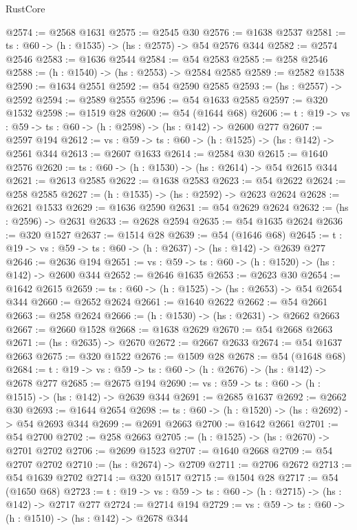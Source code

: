 \begin{lexlean}{RustCore}
\begin{coremodule}
@2574 := @2568 @1631
@2575 := @2545 @30
@2576 := @1638 @2537
@2581 := {ts : @60} -> (h : @1535) -> (hs : @2575) -> @54 @2576 @344
@2582 := @2574 @2546
@2583 := @1636 @2544
@2584 := @54 @2583
@2585 := @258 @2546
@2588 := (h : @1540) -> (hs : @2553) -> @2584 @2585
@2589 := @2582 @1538
@2590 := @1634 @2551
@2592 := @54 @2590 @2585
@2593 := (hs : @2557) -> @2592
@2594 := @2589 @2555
@2596 := @54 @1633 @2585
@2597 := @320 @1532
@2598 := @1519 @28
@2600 := @54 (@1644 @68)
@2606 := {t : @19} -> {vs : @59} -> {ts : @60} -> (h : @2598) -> (hs : @142) -> @2600 @277
@2607 := @2597 @194
@2612 := {vs : @59} -> {ts : @60} -> (h : @1525) -> (hs : @142) -> @2561 @344
@2613 := @2607 @1633
@2614 := @2584 @30
@2615 := @1640 @2576
@2620 := {ts : @60} -> (h : @1530) -> (hs : @2614) -> @54 @2615 @344
@2621 := @2613 @2585
@2622 := @1638 @2583
@2623 := @54 @2622
@2624 := @258 @2585
@2627 := (h : @1535) -> (hs : @2592) -> @2623 @2624
@2628 := @2621 @1533
@2629 := @1636 @2590
@2631 := @54 @2629 @2624
@2632 := (hs : @2596) -> @2631
@2633 := @2628 @2594
@2635 := @54 @1635 @2624
@2636 := @320 @1527
@2637 := @1514 @28
@2639 := @54 (@1646 @68)
@2645 := {t : @19} -> {vs : @59} -> {ts : @60} -> (h : @2637) -> (hs : @142) -> @2639 @277
@2646 := @2636 @194
@2651 := {vs : @59} -> {ts : @60} -> (h : @1520) -> (hs : @142) -> @2600 @344
@2652 := @2646 @1635
@2653 := @2623 @30
@2654 := @1642 @2615
@2659 := {ts : @60} -> (h : @1525) -> (hs : @2653) -> @54 @2654 @344
@2660 := @2652 @2624
@2661 := @1640 @2622
@2662 := @54 @2661
@2663 := @258 @2624
@2666 := (h : @1530) -> (hs : @2631) -> @2662 @2663
@2667 := @2660 @1528
@2668 := @1638 @2629
@2670 := @54 @2668 @2663
@2671 := (hs : @2635) -> @2670
@2672 := @2667 @2633
@2674 := @54 @1637 @2663
@2675 := @320 @1522
@2676 := @1509 @28
@2678 := @54 (@1648 @68)
@2684 := {t : @19} -> {vs : @59} -> {ts : @60} -> (h : @2676) -> (hs : @142) -> @2678 @277
@2685 := @2675 @194
@2690 := {vs : @59} -> {ts : @60} -> (h : @1515) -> (hs : @142) -> @2639 @344
@2691 := @2685 @1637
@2692 := @2662 @30
@2693 := @1644 @2654
@2698 := {ts : @60} -> (h : @1520) -> (hs : @2692) -> @54 @2693 @344
@2699 := @2691 @2663
@2700 := @1642 @2661
@2701 := @54 @2700
@2702 := @258 @2663
@2705 := (h : @1525) -> (hs : @2670) -> @2701 @2702
@2706 := @2699 @1523
@2707 := @1640 @2668
@2709 := @54 @2707 @2702
@2710 := (hs : @2674) -> @2709
@2711 := @2706 @2672
@2713 := @54 @1639 @2702
@2714 := @320 @1517
@2715 := @1504 @28
@2717 := @54 (@1650 @68)
@2723 := {t : @19} -> {vs : @59} -> {ts : @60} -> (h : @2715) -> (hs : @142) -> @2717 @277
@2724 := @2714 @194
@2729 := {vs : @59} -> {ts : @60} -> (h : @1510) -> (hs : @142) -> @2678 @344

\end{coremodule}
\end{lexlean}

